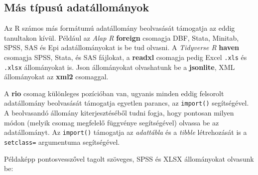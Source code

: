 \documentclass[
]{book}
\begin{document}
\hypertarget{muxe1s-tuxedpusuxfa-adatuxe1llomuxe1nyok}{%
\subsection{Más típusú adatállományok}\label{muxe1s-tuxedpusuxfa-adatuxe1llomuxe1nyok}}

Az R számos más formátumú adatállomány beolvasását támogatja az eddig tanultakon kívül. Például az \emph{Alap R} \textbf{foreign} csomagja DBF, Stata, Minitab, SPSS, SAS és Epi adatállományokat is be tud olvasni. A \emph{Tidyverse R} \textbf{haven} csomagja SPSS, Stata, és SAS fájlokat, a \textbf{readxl} csomagja pedig Excel \texttt{.xls} és \texttt{.xlsx} állományokat is. Json állományokat olvashatunk be a \textbf{jsonlite}, XML állományokat az \textbf{xml2} csomaggal.

A \textbf{rio} csomag különleges pozícióban van, ugyanis minden eddig felsorolt adatállomány beolvasását támogatja egyetlen parancs, az \texttt{import()} segítségével. A beolvasandó állomány kiterjesztéséből tudni fogja, hogy pontosan milyen módon (melyik csomag megfelelő függvénye segítségével) olvassa be az adatállományt. Az \texttt{import()} támogatja az \emph{adattábla} és a \emph{tibble} létrehozását is a \texttt{setclass=} argumentuma segítségével.

Példaképp pontosvesszővel tagolt szöveges, SPSS és XLSX állományokat olvasunk be:
\end{document}

